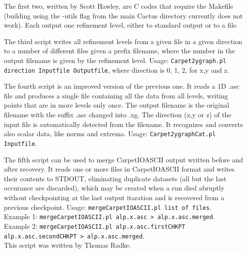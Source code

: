 \documentclass{article}
\begin{document}
The first two, written by Scott Hawley, are C codes that require the
Makefile (building using the -utils flag from the main Cactus
directory currently does not work). Each output one refinement level,
either to standard output or to a file.

The third script writes all refinement levels from a given file in a
given direction to a number of different files given a prefix
filename, where the number in the output filename is given by the
refinement level. Usage: {\tt Carpet2ygraph.pl direction Inputfile Outputfile},
where direction is 0, 1, 2, for x,y and z.

The fourth script is an improved version of the previous one. It reads a 1D .asc file and produces a
single file containing all the data from all levels, writing points that are in more levels only
once. The output filename is the original filename with the suffix .asc changed into .xg. The
direction (x,y or z) of the input file is automatically detected from the filename. It recognizes
and converts also scalar data, like norms and extrema. Usage: {\tt Carpet2ygraphCat.pl Inputfile}.

The fifth script can be used to merge CarpetIOASCII output written before and after recovery. It
reads one or more files in CarpetIOASCII format and writes their contents to STDOUT, eliminating
duplicate datasets (all but the last occurance are discarded), which may be created when a run died
abruptly without checkpointing at the last output itaration and is recovered from a previous
checkpoint.  
Usage: {\tt mergeCarpetIOASCII.pl list of files}. \\
Example 1: {\tt mergeCarpetIOASCII.pl alp.x.asc > alp.x.asc.merged}.\\ 
Example 2: {\tt mergeCarpetIOASCII.pl alp.x.asc.firstCHKPT alp.x.asc.secondCHKPT > alp.x.asc.merged}.\\
This script was written by Thomas Radke.


%

\end{document}
